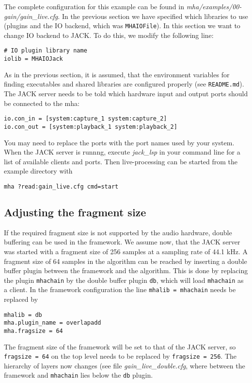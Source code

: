 The complete configuration for this example can be found in
\emph{mha/examples/00-gain/gain\_live.cfg}.
In the previous section we have specified which libraries to use
(plugins and the IO backend, which was \verb!MHAIOFile!). In this section 
we want to change IO backend to JACK. 
%
To do this, we modify the following line:
\begin{verbatim}
# IO plugin library name
iolib = MHAIOJack
\end{verbatim}
%
As in the previous section, it is assumed, that the environment
variables for finding executables and shared libraries are configured
properly (see \verb!README.md!).
The JACK server needs to be told which hardware input and output ports should be
connected to the mha:
\begin{verbatim}
io.con_in = [system:capture_1 system:capture_2]
io.con_out = [system:playback_1 system:playback_2]
\end{verbatim}
You may need to replace the ports with the port names used
by your system.
When the JACK server is runnng, execute \emph{jack\_lsp} in your command
line for a list of available clients and ports.
%
Then \mha{} live-processing can be started from the example directory with
\begin{verbatim}
mha ?read:gain_live.cfg cmd=start
\end{verbatim}

\subsection{Adjusting the fragment size}%
%
%

If the required fragment size is not supported by the audio hardware,
double buffering can be used in the \mha{} framework. We assume now,
that the JACK server was started with a fragment size of 256 samples at
a sampling rate of 44.1 kHz. A fragment size of 64 samples in the algorithm 
can be reached by inserting a double buffer plugin between the framework and the algorithm. This is
done by replacing the \mha{} plugin \verb!mhachain! by the double
buffer plugin \verb!db!, which will load \verb!mhachain! as a
client. In the framework configuration the line \verb!mhalib = mhachain! needs
be replaced by
\begin{verbatim}
mhalib = db
mha.plugin_name = overlapadd
mha.fragsize = 64
\end{verbatim}
The fragment size of the framework will be set to that of the JACK
server, so \verb!fragsize = 64! on the top level needs to be replaced by
\verb!fragsize = 256!. The hierarchy of layers now changes (see 
file \emph{gain\_live\_double.cfg}, where between the framework
and \verb!mhachain! lies below the \verb!db! plugin.


